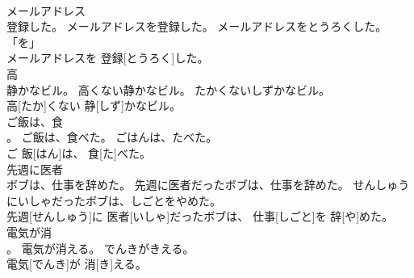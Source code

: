 \documentclass[8pt]{extreport}
\begin{document}
\begin{CJK}{UTF8}{min}
\\	メールアドレス
\\	登録した。	メールアドレスを登録した。	メールアドレスをとうろくした。	
\\	「を」 
\\	メールアドレスを 登録[とうろく]した。		
\\	高
\\	静かなビル。	高くない静かなビル。	たかくないしずかなビル。	
\\	高[たか]くない 静[しず]かなビル。		
\\	ご飯は、食
\\	。	ご飯は、食べた。	ごはんは、たべた。	
\\	ご 飯[はん]は、 食[た]べた。		
\\	先週に医者
\\	ボブは、仕事を辞めた。	先週に医者だったボブは、仕事を辞めた。	せんしゅうにいしゃだったボブは、しごとをやめた。	
\\	先週[せんしゅう]に 医者[いしゃ]だったボブは、 仕事[しごと]を 辞[や]めた。		
\\	電気が消
\\	。	電気が消える。	でんきがきえる。	
\\	電気[でんき]が 消[き]える。		
\end{CJK}
\end{document}
